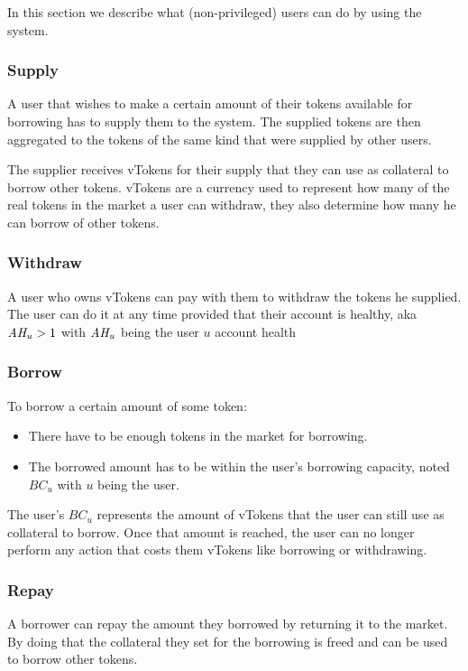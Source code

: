In this section we describe what (non-privileged) users can do by using the system. 

\subsubsection{Supply}

A user that wishes to make a certain amount of their tokens available for borrowing has to supply them to the system. The supplied tokens are then aggregated to the tokens of the same kind that were supplied by other users.

The supplier receives vTokens for their supply that they can use as collateral to borrow other tokens. vTokens are a currency used to represent how many of the real tokens in the market a user can withdraw, they also determine how many he can borrow of other tokens.

\subsubsection{Withdraw}

A user who owns vTokens can pay with them to withdraw the tokens he supplied. The user can do it at any time provided that their account is healthy, aka $\mathit{AH_{u}} > 1$ with $\mathit{AH_{u}}$ being the user $u$ account health

\subsubsection{Borrow}
To borrow a certain amount of some token:

\begin{itemize}
  \item There have to be enough tokens in the market for borrowing.
  \item The borrowed amount has to be within the user's borrowing capacity, noted $BC_u$ with $u$ being the user.
\end{itemize}

The user's $BC_u$ represents the amount of vTokens that the user can still use as collateral to borrow. Once that amount is reached, the user can no longer perform any action that costs them vTokens like borrowing or withdrawing.

\subsubsection{Repay}

A borrower can repay the amount they borrowed by returning it to the market. By doing that the collateral they set for the borrowing is freed and can be used to borrow other tokens.

